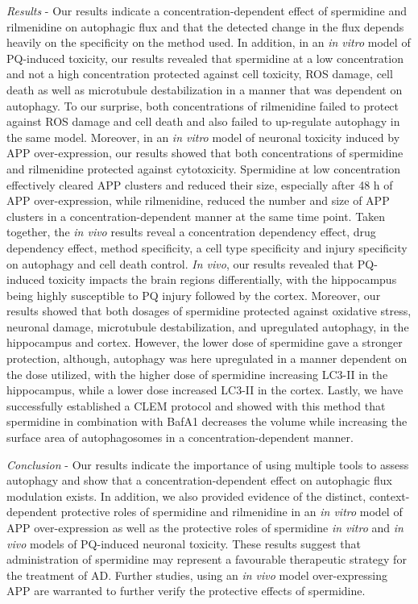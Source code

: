 \textit{Results} - Our results indicate a concentration-dependent effect of spermidine and rilmenidine on autophagic flux and that the detected change in the flux depends heavily on the specificity on the method used.  In addition, in an \textit{in vitro} model of PQ-induced toxicity, our results revealed that spermidine at a low concentration and not a high concentration protected against cell toxicity, ROS damage, cell death as well as microtubule destabilization in a manner that was dependent on autophagy. To our surprise, both concentrations of rilmenidine failed to protect against ROS damage and cell death and also failed to up-regulate autophagy in the same model.  Moreover, in an \textit{in vitro} model of neuronal toxicity induced by APP over-expression, our results showed that both concentrations of spermidine and rilmenidine protected against cytotoxicity. Spermidine at low concentration effectively cleared APP clusters and reduced their size, especially after 48 h of APP over-expression, while rilmenidine, reduced the number and size of APP clusters in a concentration-dependent manner at the same time point.  
Taken together, the \textit{in vivo} results reveal a concentration dependency effect, drug dependency effect, method specificity, a cell type specificity and injury specificity on autophagy and cell death control. \textit{In vivo}, our results revealed that PQ-induced toxicity impacts the brain regions differentially, with the hippocampus being highly susceptible to PQ injury followed by the cortex. Moreover, our results showed that both dosages of spermidine protected against oxidative stress, neuronal damage, microtubule destabilization, and upregulated autophagy, in the hippocampus and cortex. However, the lower dose of spermidine gave a stronger protection, although, autophagy was here upregulated in a manner dependent on the dose utilized, with the higher dose of spermidine increasing LC3-II in the hippocampus, while a lower dose increased LC3-II in the cortex. Lastly, we have successfully established a CLEM protocol and showed with this method that spermidine in combination with BafA1 decreases the volume while increasing the surface area of autophagosomes in a concentration-dependent manner. 

\textit{Conclusion} - Our results indicate the importance of using multiple tools to assess autophagy and show that a concentration-dependent effect on autophagic flux modulation exists. In addition, we also provided evidence of the distinct, context-dependent protective roles of spermidine and rilmenidine in an \textit{in vitro} model of APP over-expression as well as the protective roles of spermidine \textit{in vitro} and \textit{in vivo} models of PQ-induced neuronal toxicity. These results suggest that administration of spermidine may represent a favourable therapeutic strategy for the treatment of AD. Further studies, using an \textit{in vivo} model over-expressing APP are warranted to further verify the protective effects of spermidine. 

